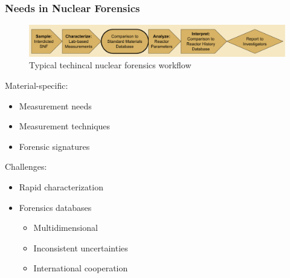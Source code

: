 \begin{frame}
  \frametitle{Needs in Nuclear Forensics}
  \begin{figure}
    \centering
    \includegraphics[width=\textwidth]{./figures/forensicsrealworld.png}
    \caption{Typical techincal nuclear forensics workflow}
  \end{figure}
  \begin{minipage}[t]{0.5\textwidth}
    Material-specific:
    \begin{itemize}
      \item Measurement needs
      \item Measurement techniques
      \item Forensic signatures
    \end{itemize}
  \end{minipage}%
  \begin{minipage}[t]{0.5\textwidth}
    Challenges:
    \begin{itemize}
      \item Rapid characterization
      \item Forensics databases
      \begin{itemize}
        \item Multidimensional
        \item Inconsistent uncertainties
        \item International cooperation
      \end{itemize}
    \end{itemize}
  \end{minipage}
\end{frame}

